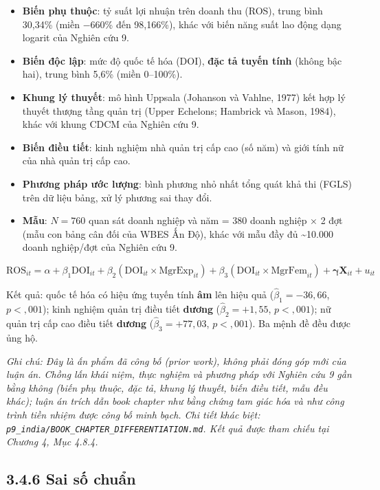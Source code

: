 \documentclass[
  a4paper,
  13pt]{extreport}
\providecommand{\tightlist}{%
  \setlength{\itemsep}{0pt}\setlength{\parskip}{0pt}}
\begin{document}
\begin{itemize}
\tightlist
\item
  \textbf{Biến phụ thuộc}: tỷ suất lợi nhuận trên doanh thu (ROS), trung
  bình 30,34\% (miền −660\% đến 98,166\%), khác với biến năng suất lao
  động dạng logarit của Nghiên cứu 9.
\item
  \textbf{Biến độc lập}: mức độ quốc tế hóa (DOI), \textbf{đặc tả tuyến
  tính} (không bậc hai), trung bình 5,6\% (miền 0--100\%).
\item
  \textbf{Khung lý thuyết}: mô hình Uppsala (Johanson và Vahlne, 1977)
  kết hợp lý thuyết thượng tầng quản trị (Upper Echelons; Hambrick và
  Mason, 1984), khác với khung CDCM của Nghiên cứu 9.
\item
  \textbf{Biến điều tiết}: kinh nghiệm nhà quản trị cấp cao (số năm) và
  giới tính nữ của nhà quản trị cấp cao.
\item
  \textbf{Phương pháp ước lượng}: bình phương nhỏ nhất tổng quát khả thi
  (FGLS) trên dữ liệu bảng, xử lý phương sai thay đổi.
\item
  \textbf{Mẫu}: \(N = 760\) quan sát doanh nghiệp và năm = 380 doanh
  nghiệp × 2 đợt (mẫu con bảng cân đối của WBES Ấn Độ), khác với mẫu đầy
  đủ \textasciitilde10.000 doanh nghiệp/đợt của Nghiên cứu 9.
\end{itemize}

\[\mathrm{ROS}_{it} = \alpha + \beta_1 \mathrm{DOI}_{it} + \beta_2(\mathrm{DOI}_{it}\times\mathrm{MgrExp}_{it}) + \beta_3(\mathrm{DOI}_{it}\times\mathrm{MgrFem}_{it}) + \boldsymbol{\gamma}\mathbf{X}_{it} + u_{it}\]

Kết quả: quốc tế hóa có hiệu ứng tuyến tính \textbf{âm} lên hiệu quả
(\(\hat\beta_1 = -36{,}66\), \(p < {,}001\)); kinh nghiệm quản trị điều
tiết \textbf{dương} (\(\hat\beta_2 = +1{,}55\), \(p < {,}001\)); nữ quản
trị cấp cao điều tiết \textbf{dương} (\(\hat\beta_3 = +77{,}03\),
\(p < {,}001\)). Ba mệnh đề đều được ủng hộ.

\emph{Ghi chú: Đây là ấn phẩm đã công bố (prior work), không phải đóng
góp mới của luận án. Chồng lấn khái niệm, thực nghiệm và phương pháp với
Nghiên cứu 9 gần bằng không (biến phụ thuộc, đặc tả, khung lý thuyết,
biến điều tiết, mẫu đều khác); luận án trích dẫn book chapter như bằng
chứng tam giác hóa và như công trình tiền nhiệm được công bố minh bạch.
Chi tiết khác biệt:
\texttt{p9\_india/BOOK\_CHAPTER\_DIFFERENTIATION.md}. Kết quả được tham
chiếu tại Chương 4, Mục 4.8.4.}

\hypertarget{sai-sux1ed1-chuux1ea9n}{%
\subsection{3.4.6 Sai số chuẩn}\label{sai-sux1ed1-chuux1ea9n}}
\end{document}
